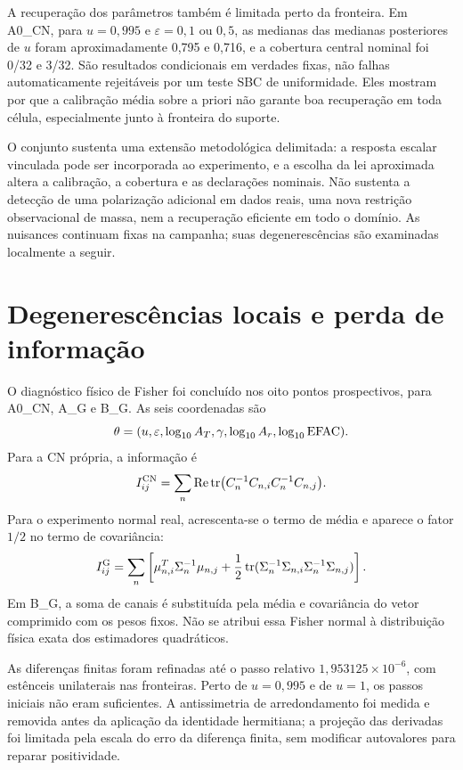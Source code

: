 A recuperação dos parâmetros também é limitada perto da fronteira.
Em A0\_CN, para $u=0{,}995$ e $\varepsilon=0{,}1$ ou $0{,}5$,
as medianas das medianas posteriores de $u$ foram aproximadamente
0,795 e 0,716, e a cobertura central nominal foi 0/32 e 3/32.
São resultados condicionais em verdades fixas, não falhas automaticamente
rejeitáveis por um teste SBC de uniformidade. Eles mostram por que a
calibração média sobre a priori não garante boa recuperação em toda
célula, especialmente junto à fronteira do suporte.

O conjunto sustenta uma extensão metodológica delimitada: a resposta
escalar vinculada pode ser incorporada ao experimento, e a escolha da lei
aproximada altera a calibração, a cobertura e as declarações nominais.
Não sustenta a detecção de uma polarização adicional em dados reais,
uma nova restrição observacional de massa, nem a recuperação eficiente
em todo o domínio. As nuisances continuam fixas na campanha; suas
degenerescências são examinadas localmente a seguir.

\section{Degenerescências locais e perda de informação}

O diagnóstico físico de Fisher foi concluído nos oito pontos prospectivos, para A0\_CN, A\_G e B\_G. As seis coordenadas são
\begin{equation}
 \theta=(u,\varepsilon,\log_{10}A_T,\gamma,
 \log_{10}A_r,\log_{10}{\rm EFAC}).
\end{equation}
Para a CN própria, a informação é
\begin{equation}
 I_{ij}^{\rm CN}=\sum_n\operatorname{Re}\operatorname{tr}
 \bigl(C_n^{-1}C_{n,i}C_n^{-1}C_{n,j}\bigr).
\end{equation}
Para o experimento normal real, acrescenta-se o termo de média e aparece o fator $1/2$ no termo de covariância:
\begin{equation}
 I_{ij}^{\rm G}=\sum_n\left[
 \mu_{n,i}^{T}\Sigma_n^{-1}\mu_{n,j}
 +\frac12\operatorname{tr}
 (\Sigma_n^{-1}\Sigma_{n,i}\Sigma_n^{-1}\Sigma_{n,j})\right].
\end{equation}
Em B\_G, a soma de canais é substituída pela média e covariância do vetor comprimido com os pesos fixos. Não se atribui essa Fisher normal à distribuição física exata dos estimadores quadráticos.

As diferenças finitas foram refinadas até o passo relativo $1{,}953125\times10^{-6}$, com estênceis unilaterais nas fronteiras. Perto de $u=0{,}995$ e de $u=1$, os passos iniciais não eram suficientes. A antissimetria de arredondamento foi medida e removida antes da aplicação da identidade hermitiana; a projeção das derivadas foi limitada pela escala do erro da diferença finita, sem modificar autovalores para reparar positividade.

